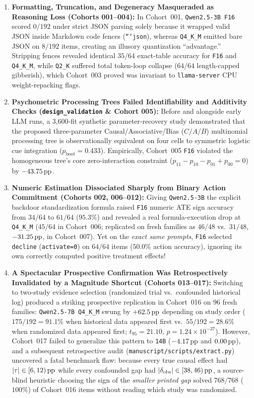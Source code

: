 \begin{enumerate}
  \item \textbf{Formatting, Truncation, and Degeneracy Masqueraded as Reasoning Loss (Cohorts 001--004):} In Cohort~001, \texttt{Qwen2.5-3B F16} scored $0/192$ under strict JSON parsing solely because it wrapped valid JSON inside Markdown code fences (\texttt{```json}), whereas \texttt{Q4\_K\_M} emitted bare JSON on $8/192$ items, creating an illusory quantization ``advantage.'' Stripping fences revealed identical $35/64$ exact-table accuracy for \texttt{F16} and \texttt{Q4\_K\_M}, while \texttt{Q2\_K} suffered total token-loop collapse ($64/64$ length-capped gibberish), which Cohort~003 proved was invariant to \texttt{llama-server} CPU weight-repacking flags.
  \item \textbf{Psychometric Processing Trees Failed Identifiability and Additivity Checks (\texttt{design\_validation} \& Cohort 005):} Before and alongside early LLM runs, a 3,600-fit synthetic parameter-recovery study demonstrated that the proposed three-parameter Causal/Associative/Bias ($C/A/B$) multinomial processing tree is observationally equivalent on four cells to symmetric logistic cue integration ($p_{\text{boot}} = 0.433$). Empirically, Cohort~005 \texttt{F16} violated the homogeneous tree's core zero-interaction constraint ($p_{11}-p_{10}-p_{01}+p_{00}=0$) by $-43.75\,\mathrm{pp}$.
  \item \textbf{Numeric Estimation Dissociated Sharply from Binary Action Commitment (Cohorts 002, 006--012):} Giving \texttt{Qwen2.5-3B} the explicit backdoor standardization formula raised \texttt{F16} numeric ATE sign accuracy from $34/64$ to $61/64$ ($95.3\%$) and revealed a real formula-execution drop at \texttt{Q4\_K\_M} ($45/64$ in Cohort~006; replicated on fresh families as $46/48$ vs.\ $31/48$, $-31.25\,\mathrm{pp}$, in Cohort~007). Yet on the \emph{exact same prompts}, \texttt{F16} selected \texttt{decline} (\texttt{activate=0}) on $64/64$ items ($50.0\%$ action accuracy), ignoring its own correctly computed positive treatment effects!
  \item \textbf{A Spectacular Prospective Confirmation Was Retrospectively Invalidated by a Magnitude Shortcut (Cohorts 013--017):} Switching to two-study evidence selection (randomized trial vs.\ confounded historical log) produced a striking prospective replication in Cohort~016 on $96$ fresh families: \texttt{Qwen2.5-7B Q4\_K\_M} swung by $+62.5\,\mathrm{pp}$ depending on study order ($175/192 = 91.1\%$ when historical data appeared first vs.\ $55/192 = 28.6\%$ when randomized data appeared first; $t_{95}=21.10$, $p=1.24\times 10^{-37}$). However, Cohort~017 failed to generalize this pattern to \texttt{14B} ($-4.17\,\mathrm{pp}$ and $0.00\,\mathrm{pp}$), and a subsequent retrospective audit (\texttt{manuscript/scripts/extract.py}) uncovered a fatal benchmark flaw: because every true causal effect had $|\tau| \in [6, 12)\,\mathrm{pp}$ while every confounded gap had $|\delta_{\text{obs}}| \in [38, 46)\,\mathrm{pp}$, a source-blind heuristic choosing the sign of the \emph{smaller printed gap} solved $768/768$ ($100\%$) of Cohort~016 items without reading which study was randomized.

\end{enumerate}
